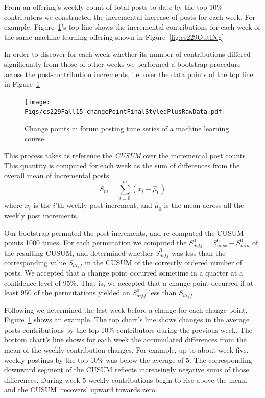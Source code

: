 From an offering's weekly count of total posts to date by the top 10\%
contributors we constructed the incremental increase of posts for each
week. For example, Figure~\ref{fig:cs229ChangePts}'s top line shows
the incremental contributions for each week of the same machine
learning offering shown in Figure~\ref{fig:cs229OutDeg}

In order to discover for each week whether its number of contributions
differed significantly from those of other weeks we performed a
bootstrap procedure across the post-contribution increments, i.e. over
the data points of the top line in Figure~\ref{fig:cs229ChangePts}
\cite{tayl16}
\begin{figure}[htp]
       \centering
       \texttt{[image: Figs/cs229Fall15\_changePointFinalStyledPlusRawData.pdf]}
       \caption{\textnormal{Change points in forum posting 
           time series of a machine learning course.}}
       \label{fig:cs229ChangePts}
\end{figure}
This process takes as reference the {\em CUSUM} over the incremental
post counts \cite{nist2012}. This quantity is computed for each week
as the sum of differences from the overall mean of incremental posts.
\begin{equation}
S_m = \sum_{i=0}^{m}(x_i-\hat{\mu}_0)
\end{equation}
where $x_i$ is the $i$'th weekly post increment, and $\hat{\mu}_0$ is
the mean across all the weekly post increments.

Our bootstrap permuted the post increments, and re-computed the CUSUM
points 1000 times. For each permutation we computed the $S_{diff}^0 =
S_{max}^0-S_{min}^0$ of the resulting CUSUM, and determined whether
$S_{diff}^0$ was less than the corresponding value $S_{diff}$ in the
CUSUM of the correctly ordered number of posts. We accepted that a
change point occurred sometime in a quarter at a confidence level of
95\%. That is, we accepted that a change point occurred if at least
950 of the permutations yielded an $S_{diff}^0$ less than $S_{diff}$.



Following \cite{tayl16} we determined the last week before a change
for each change point. Figure~\ref{fig:cs229ChangePts} shows an
example.
The top chart's line shows changes in the average posts contributions
by the top-10\% contributors during the previous week. The bottom
chart's line shows for each week the accumulated differences from the
mean of the weekly contribution changes. For example, up to about week
five, weekly postings by the top-10\% was below the average of 5. The
corresponding downward segment of the CUSUM reflects increasingly
negative sums of those differences. During week 5 weekly contributions
begin to rise above the mean, and the CUSUM `recovers' upward towards
zero.

